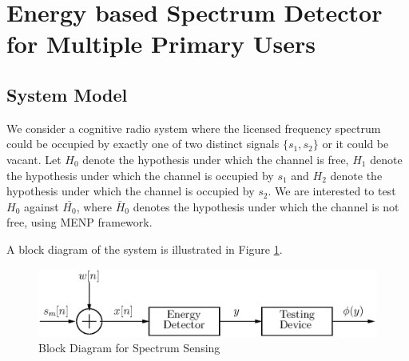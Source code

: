 \section{Energy based Spectrum Detector for Multiple Primary Users}
\subsection{System Model}
We consider a cognitive radio system where the licensed frequency spectrum could be occupied by exactly one of two distinct signals $\{s_1, s_2\}$ or it could be vacant. Let $H_0$ denote the hypothesis under which the channel is free, ${H}_1$ denote the hypothesis under which the channel is occupied by $s_1$ and ${H}_2$ denote the hypothesis under which the channel is occupied by $s_2$. We are interested to test $H_0$ against $\bar{{H}_0}$, where $\bar{H}_0$ denotes the hypothesis under which the channel is not free, using MENP framework.

A block diagram of the system is illustrated in Figure \ref{pic: block diagram}.

\begin{figure}[!hbp]
\centering
\includegraphics[width = \textwidth]{4/block_diagram.eps}
\caption{Block Diagram for Spectrum Sensing}
\label{pic: block diagram}
\end{figure}


